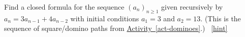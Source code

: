 \documentclass{book}
\begin{document}
\setcounter{project}{149}
\addtocounter{project}{-1}
\begin{activity}[]\label{activity-142}
\hypertarget{p-1005}{}%
Find a closed formula for the sequence \((a_n)_{n \ge 1}\) given recursively by \(a_n = 3a_{n-1} + 4a_{n-2}\) with initial conditions \(a_1 = 3\) and \(a_2 = 13\).  (This is the sequence of square/domino paths from \hyperref[act-dominoes]{Activity~\ref{act-dominoes}}.)%
~\hfill{\tiny\hyperlink{a-149}{[hint]}\hypertarget{q-149}{}}\end{activity}
\end{document}
